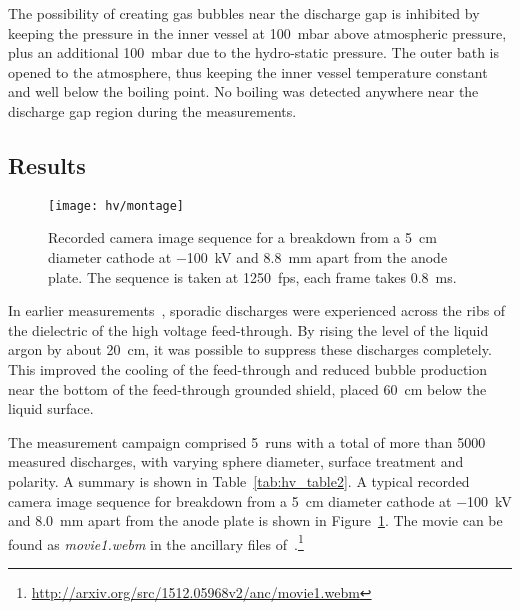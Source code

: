 The possibility of creating gas bubbles near the discharge gap is inhibited by keeping the pressure in the inner vessel at \SI{100}{\milli\bar} above atmospheric pressure, plus an additional \SI{100}{\milli\bar} due to the hydro-static pressure.
The outer bath is opened to the atmosphere, thus keeping the inner vessel temperature constant and well below the boiling point.
No boiling was detected anywhere near the discharge gap region during the measurements.


\subsection{Results}
\label{sec:studies_hv_results}

\begin{figure}[htb]
	\centering	
	\texttt{[image: hv/montage]}
	\caption{Recorded camera image sequence for a breakdown from a \SI{5}{\centi\metre} diameter cathode at \SI{-100}{\kilo\volt} and \SI{8.8}{\milli\metre} apart from the anode plate. The sequence is taken at \SI{1250}{fps}, each frame takes \SI{0.8}{\milli\second}.}
	\label{fig:hv_images}
\end{figure}

In earlier measurements~\cite{breakdown_14}, sporadic discharges were experienced across the ribs of the dielectric of the high voltage feed-through.
By rising the level of the liquid argon by about \SI{20}{\centi\metre}, it was possible to suppress these discharges completely.
This improved the cooling of the feed-through and reduced bubble production near the bottom of the feed-through grounded shield, placed \SI{60}{\centi\metre} below the liquid surface. 

The measurement campaign comprised \num{5}~runs with a total of more than \num{5000} measured discharges, with varying sphere diameter, surface treatment and polarity.
A summary is shown in Table~\ref{tab:hv_table2}.
A typical recorded camera image sequence for breakdown from a \SI{5}{\centi\metre} diameter cathode at \SI{-100}{\kilo\volt} and \SI{8.0}{\milli\metre} apart from the anode plate is shown in Figure~\ref{fig:hv_images}.
The movie can be found as \emph{movie1.webm} in the ancillary files of~\cite{breakdown_16}.\footnote{\url{http://arxiv.org/src/1512.05968v2/anc/movie1.webm}}

